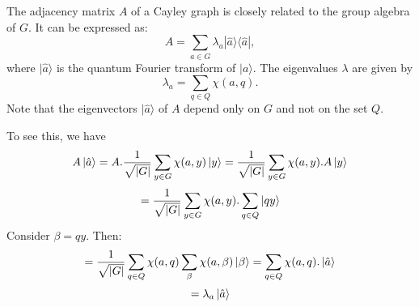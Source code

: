 \documentclass[12pt]{report}
\begin{document}
The adjacency matrix $A$ of a Cayley graph is closely related to the group algebra of $G$. It can be expressed as:
\[
A = \sum_{a \in G} \lambda_a |\hat{a}\rangle \langle \hat{a}|,
\]
where $|\hat{a}\rangle$ is the quantum Fourier transform of $|a\rangle$. The eigenvalues $\lambda$ are given by
\[
\lambda_a = \sum_{q \in Q} \chi(a, q).
\]
Note that the eigenvectors $|\hat{a}\rangle$ of $A$ depend only on $G$ and not on the set $Q$.

To see this, we have
\[
        A\ket{\hat{a}} = A.\frac{1}{\sqrt{|G|}}\sum_{y \in G}\chi(a,y)\ket{y} = \frac{1}{\sqrt{|G|}}\sum_{y \in G}\chi(a,y).A\ket{y}
        \]
        \[
        = \frac{1}{\sqrt{|G|}}\sum_{y \in G}\chi(a,y).\sum_{q \in Q}\ket{qy}
        \]
        Consider $\beta = qy$. Then:
        \[
         = \frac{1}{\sqrt{|G|}}\sum_{q \in Q}\chi(a,q)\sum_{\beta}\chi(a,\beta)\ket{\beta} = \sum_{q \in Q}\chi(a,q) . \ket{\hat{a}}
        \]
        \[
         = \lambda_a\ket{\hat{a}}
        \]





\end{document}
